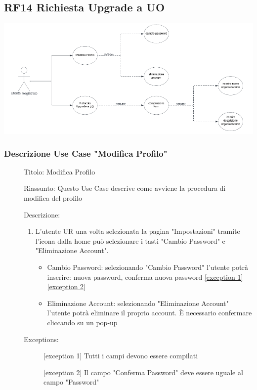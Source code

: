 \documentclass{article}
\begin{document}
\subsection{RF14 Richiesta Upgrade a UO}
\begin{center}
    \item[] \includegraphics[scale=0.5]{UseCase_4.png}
\end{center}
\subsubsection*{Descrizione Use Case "Modifica Profilo"}
\begin{description}
    \item[] Titolo: Modifica Profilo
    \item[] Riassunto: Questo Use Case descrive come avviene la procedura di modifica del profilo
    \item[] Descrizione:
        \begin{enumerate}
            \item L'utente UR una volta selezionata la pagina "Impostazioni" tramite l'icona  dalla home può selezionare i tasti "Cambio Password" e "Eliminazione Account".
                  \begin{itemize}
                      \item Cambio Password: selezionando "Cambio Password" l'utente potrà inserire: nuova password, conferma nuova password \hyperref[exc:12.1]{[exception 1]}\hyperref[exc:12.2]{[exception 2]}
                      \item Eliminazione Account: selezionando "Eliminazione Account" l'utente potrà eliminare il proprio account. È necessario confermare cliccando su un pop-up
                  \end{itemize}
        \end{enumerate}
    \item[] Exceptions:
        \begin{description}
            \item[] \label{exc:12.1} [exception 1] Tutti i campi devono essere compilati
            \item[] \label{exc:12.2} [exception 2] Il campo "Conferma Password" deve essere uguale al campo "Password"
        \end{description}
\end{description}
\end{document}
